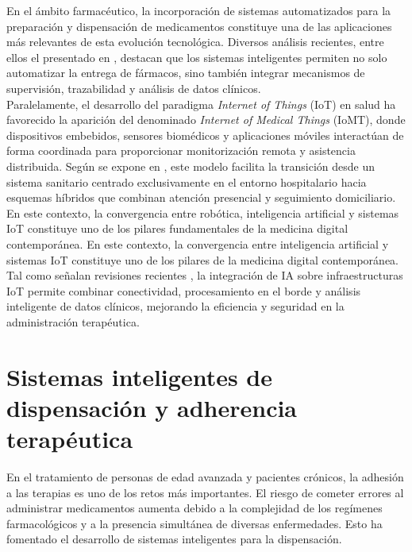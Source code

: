 En el ámbito farmacéutico, la incorporación de sistemas automatizados para la preparación y dispensación de medicamentos constituye una de las aplicaciones más relevantes de esta evolución tecnológica. Diversos análisis recientes, entre ellos el presentado en \cite{gargioni2024}, destacan que los sistemas inteligentes permiten no solo automatizar la entrega de fármacos, sino también integrar mecanismos de supervisión, trazabilidad y análisis de datos clínicos.\\

Paralelamente, el desarrollo del paradigma \textit{Internet of Things} (IoT) en salud ha favorecido la aparición del denominado \textit{Internet of Medical Things} (IoMT), donde dispositivos embebidos, sensores biomédicos y aplicaciones móviles interactúan de forma coordinada para proporcionar monitorización remota y asistencia distribuida. Según se expone en \cite{iot2022}, este modelo facilita la transición desde un sistema sanitario centrado exclusivamente en el entorno hospitalario hacia esquemas híbridos que combinan atención presencial y seguimiento domiciliario.\\

En este contexto, la convergencia entre robótica, inteligencia artificial y sistemas IoT constituye uno de los pilares fundamentales de la medicina digital contemporánea. En este contexto, la convergencia entre inteligencia artificial y sistemas IoT constituye uno de los pilares de la medicina digital contemporánea. Tal como señalan revisiones recientes \cite{alsabah2025}, la integración de IA sobre infraestructuras IoT permite combinar conectividad, procesamiento en el borde y análisis inteligente de datos clínicos, mejorando la eficiencia y seguridad en la administración terapéutica.\\

\section{Sistemas inteligentes de dispensación y adherencia terapéutica}
\label{sec:dispensacion_adherencia}

En el tratamiento de personas de edad avanzada y pacientes crónicos, la adhesión a las terapias es uno de los retos más importantes. El riesgo de cometer errores al administrar medicamentos aumenta debido a la complejidad de los regímenes farmacológicos y a la presencia simultánea de diversas enfermedades. Esto ha fomentado el desarrollo de sistemas inteligentes para la dispensación.\\


